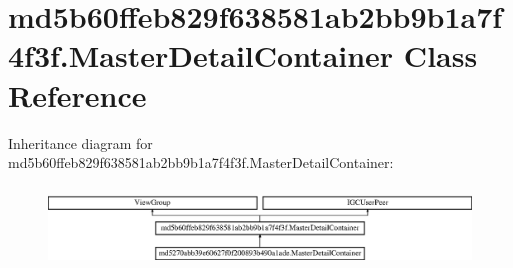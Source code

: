 \hypertarget{classmd5b60ffeb829f638581ab2bb9b1a7f4f3f_1_1MasterDetailContainer}{}\section{md5b60ffeb829f638581ab2bb9b1a7f4f3f.\+Master\+Detail\+Container Class Reference}
\label{classmd5b60ffeb829f638581ab2bb9b1a7f4f3f_1_1MasterDetailContainer}
Inheritance diagram for md5b60ffeb829f638581ab2bb9b1a7f4f3f.\+Master\+Detail\+Container\+:\begin{figure}[H]
\begin{center}
\leavevmode
\includegraphics[height=2.148338cm]{classmd5b60ffeb829f638581ab2bb9b1a7f4f3f_1_1MasterDetailContainer}
\end{center}
\end{figure}
